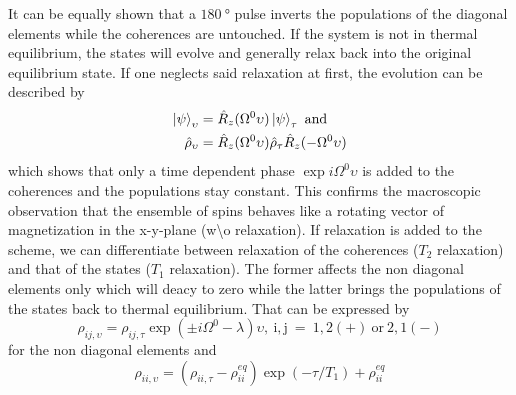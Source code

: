             It can be equally shown that a $\SI{180}{\degree}$ pulse inverts the populations of the
            diagonal elements while the coherences are untouched.
            If the system is not in thermal equilibrium, the states will evolve and generally relax back
            into the original equilibrium state. If one neglects said relaxation at first, the evolution
            can be described by 
            \begin{equation}
                \begin{split}
                    \ket\psi_\upsilon &= \hat R_z(\Omega^0\upsilon)\ket\psi_\tau ~ \mathrm{and} \\
                    \hat\rho_\upsilon &= \hat R_z(\Omega^0\upsilon)\hat\rho_\tau\hat
                    R_z(-\Omega^0\upsilon)
                \end{split}
            \end{equation}
            which shows that only a time dependent phase $\exp{i\Omega^0 \upsilon}$ is added to the coherences and the populations
            stay constant. This confirms the macroscopic observation that the ensemble of spins behaves like a rotating vector of
            magnetization in the x-y-plane (w\textbackslash o relaxation).
            If relaxation is added to the scheme, we can differentiate between relaxation of the
            coherences ($T_2$ relaxation) and that of the states ($T_1$ relaxation). The former affects
            the non diagonal elements only which will deacy to zero while the latter brings the populations of the states back to
            thermal equilibrium. That can be expressed by
            \begin{equation}
                \rho_{ij, \upsilon} = \rho_{ij, \tau} \exp{(\pm
                    i\Omega^0-\lambda)\upsilon},~\mathrm{i,j~=~
                1,2(+)~or~2,1(-)}
            \end{equation}
            for the non diagonal elements and
            \begin{equation}
                \rho_{ii,\upsilon} = (\rho_{ii,\tau} - \rho_{ii}^{eq})\exp(-\tau/T_1)+\rho_{ii}^{eq}
            \end{equation}
